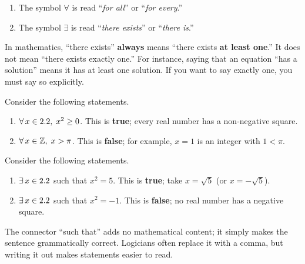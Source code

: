\begin{definition}[Quantifiers]
\label{def:1-7}
\begin{enumerate}[label=(\roman*)]
  \item The symbol $\forall$ is read ``\emph{for all}'' or ``\emph{for every}.''
  \item The symbol $\exists$ is read ``\emph{there exists}'' or ``\emph{there is}.''
\end{enumerate}
\end{definition}

\begin{remark}
In mathematics, ``there exists'' \textbf{always} means ``there exists \textbf{at least one}.''  It does not mean ``there exists exactly one.''  For instance, saying that an equation ``has a solution'' means it has at least one solution.  If you want to say exactly one, you must say so explicitly.
\end{remark}

\begin{example}
\label{ex:1-4}
Consider the following statements.
\begin{enumerate}[label=(\alph*)]
  \item $\forall\, x \in 2.2,\; x^{2} \ge 0$.  \quad This is \textbf{true}; every real number has a non-negative square.
  \item $\forall\, x \in \mathbb{Z},\; x > \pi$.  \quad This is \textbf{false}; for example, $x = 1$ is an integer with $1 < \pi$.
\end{enumerate}
\end{example}

\begin{example}
\label{ex:1-5}
Consider the following statements.
\begin{enumerate}[label=(\alph*)]
  \item $\exists\, x \in 2.2$ such that $x^{2} = 5$.  \quad This is \textbf{true}; take $x = \sqrt{5}$ (or $x = -\sqrt{5}$).
  \item $\exists\, x \in 2.2$ such that $x^{2} = -1$.  \quad This is \textbf{false}; no real number has a negative square.
\end{enumerate}
\end{example}

\begin{remark}
The connector ``such that'' adds no mathematical content; it simply makes the sentence grammatically correct.  Logicians often replace it with a comma, but writing it out makes statements easier to read.
\end{remark}

